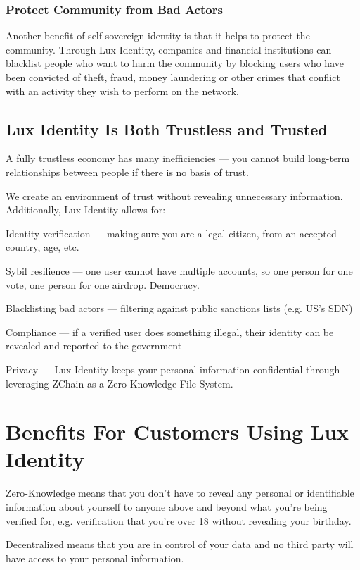 \documentclass[11pt]{article}
\begin{document}
\subsubsection{Protect Community from Bad Actors}

Another benefit of self-sovereign identity is that it helps to protect the community. Through Lux Identity, companies and financial institutions can blacklist people who want to harm the community by blocking users who have been convicted of theft, fraud, money laundering or other crimes that conflict with an activity they wish to perform on the network.


\subsection{Lux Identity Is Both Trustless and Trusted}

A fully trustless economy has many inefficiencies --- you cannot build long-term relationships between people if there is no basis of trust.


We create an environment of trust without revealing unnecessary information. Additionally, Lux Identity allows for:


Identity verification --- making sure you are a legal citizen, from an accepted country, age, etc.


Sybil resilience --- one user cannot have multiple accounts, so one person for one vote, one person for one airdrop. Democracy.


Blacklisting bad actors --- filtering against public sanctions lists (e.g. US's SDN)


Compliance --- if a verified user does something illegal, their identity can be revealed and reported to the government


Privacy --- Lux Identity keeps your personal information confidential through leveraging ZChain as a Zero Knowledge File System.


\section{Benefits For Customers Using Lux Identity}

Zero-Knowledge means that you don't have to reveal any personal or identifiable information about yourself to anyone above and beyond what you're being verified for, e.g. verification that you're over 18 without revealing your birthday.


Decentralized means that you are in control of your data and no third party will have access to your personal information.
\end{document}
